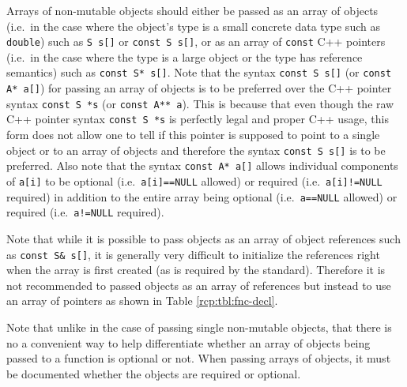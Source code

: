 Arrays of non-mutable objects should either be passed as an array of
objects (i.e.~in the case where the object's type is a small concrete
data type such as {}\texttt{double}) such as {}\texttt{S s[]} or
{}\texttt{const S s[]}, or as an array of {}\texttt{const} C++
pointers (i.e.~in the case where the type is a large object or the
type has reference semantics) such as {}\texttt{const S* s[]}.  Note
that the syntax {}\texttt{const S s[]} (or {}\texttt{const A* a[]})
for passing an array of objects is to be preferred over the C++
pointer syntax {}\texttt{const S *s} (or {}\texttt{const A** a}).
This is because that even though the raw C++ pointer syntax
{}\texttt{const S *s} is perfectly legal and proper C++ usage, this
form does not allow one to tell if this pointer is supposed to point
to a single object or to an array of objects and therefore the syntax
{}\texttt{const S s[]} is to be preferred.  Also note that the syntax
{}\texttt{const A* a[]} allows individual components of
{}\texttt{a[i]} to be optional (i.e.~{}\texttt{a[i]==NULL} allowed) or
required (i.e.~{}\texttt{a[i]!=NULL} required) in addition to the
entire array being optional (i.e.~{}\texttt{a==NULL} allowed) or
required (i.e.~{}\texttt{a!=NULL} required).

Note that while it is possible to pass objects as an array of object
references such as {}\texttt{const S\& s[]}, it is generally very
difficult to initialize the references right when the array is first
created (as is required by the standard).  Therefore it is not
recommended to passed objects as an array of references but instead to
use an array of pointers as shown in Table {}\ref{rcp:tbl:fnc-decl}.

Note that unlike in the case of passing single non-mutable objects,
that there is no a convenient way to help differentiate whether an
array of objects being passed to a function is optional or not.  When
passing arrays of objects, it must be documented whether the objects
are required or optional.

